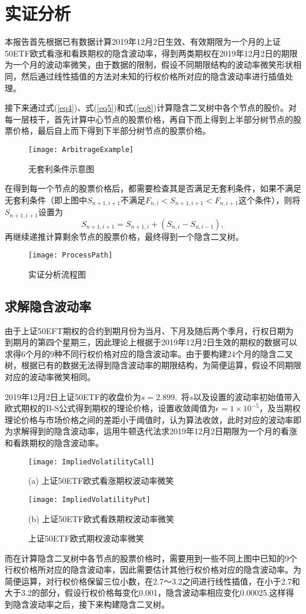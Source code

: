 \chapter{实证分析}
本报告首先根据已有数据计算2019年12月2日生效、有效期限为一个月的上证50ETF欧式看涨和看跌期权的隐含波动率，得到两类期权在2019年12月2日的期限为一个月的波动率微笑，由于数据的限制，假设不同期限结构的波动率微笑形状相同，然后通过线性插值的方法对未知的行权价格所对应的隐含波动率进行插值处理。

接下来通过式(\ref{eq4})、式(\ref{eq5})和式(\ref{eq8})计算隐含二叉树中各个节点的股价。对每一层枝干，首先计算中心节点的股票价格，再自下而上得到上半部分树节点的股票价格，最后自上而下得到下半部分树节点的股票价格。
\begin{figure}[H]
	\label{ArbFig}
	\centering
	\texttt{[image: ArbitrageExample]}
	\caption{无套利条件示意图}
\end{figure}
在得到每一个节点的股票价格后，都需要检查其是否满足无套利条件，如果不满足无套利条件（即上图中$S_{n+1,i+1}$不满足$F_{n,i}<S_{n+1,i+1}<F_{n,i+1}$这个条件），则将$S_{n+1,i+1}$设置为
$$S_{n+1,i+1} = S_{n+1,i}+\left(S_{n,i}-S_{n,i-1}\right), $$
再继续递推计算剩余节点的股票价格，最终得到一个隐含二叉树。
\begin{figure}[H]
	\centering
	\texttt{[image: ProcessPath]}
	\caption{实证分析流程图}
\end{figure}

\section{求解隐含波动率}
由于上证50EFT期权的合约到期月份为当月、下月及随后两个季月，行权日期为到期月的第四个星期三，因此理论上根据于2019年12月2日生效的期权的数据可以求得6个月的9种不同行权价格对应的隐含波动率。由于要构建24个月的隐含二叉树，根据已有的数据无法得到隐含波动率的期限结构，为简便运算，假设不同期限对应的波动率微笑相同。

2019年12月2日上证50ETF的收盘价为$s = 2.899,$
将$s$以及设置的波动率初始值带入欧式期权的B-S公式得到期权的理论价格，设置收敛阈值为$\epsilon = 1\times 10^{-5}$，及当期权理论价格与市场价格之间的差距小于阈值时，认为算法收敛，此时对应的波动率即为求解得到的隐含波动率，运用牛顿迭代法求2019年12月2日期限为一个月的看涨和看跌期权的隐含波动率。

\begin{figure}[H]
	\begin{minipage}[H]{0.5\linewidth}
		\centering
		\texttt{[image: ImpliedVolatilityCall]}
		\caption*{(a) 上证50ETF欧式看涨期权波动率微笑}
	\end{minipage}
	\begin{minipage}[H]{0.5\linewidth}
		\centering
		\texttt{[image: ImpliedVolatilityPut]}
		\caption*{(b) 上证50ETF欧式看跌期权波动率微笑}
	\end{minipage}
	\caption{上证50ETF欧式期权波动率微笑}
\end{figure}
而在计算隐含二叉树中各节点的股票价格时，需要用到一些不同上图中已知的9个行权价格所对应的隐含波动率，因此需要估计其他行权价格对应的隐含波动率。为简便运算，对行权价格保留三位小数，在2.7～3.2之间进行线性插值，在小于2.7和大于3.2的部分，假设行权价格每变化0.001，隐含波动率相应变化0.00025.这样得到隐含波动率之后，接下来构建隐含二叉树。


